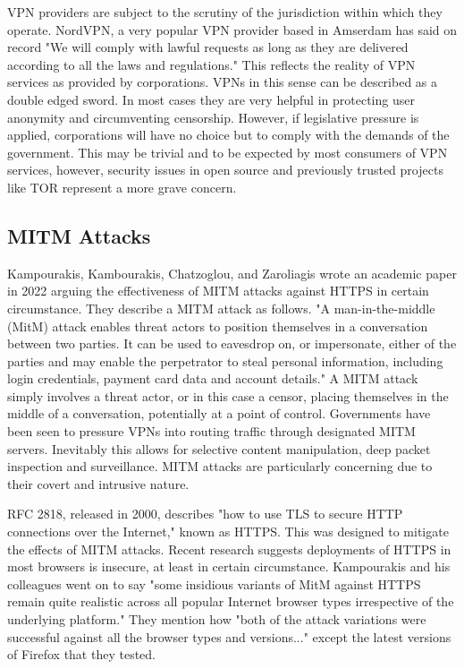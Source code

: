 VPN providers are subject to the scrutiny of the jurisdiction within which they operate. NordVPN, a very popular VPN provider based in Amserdam has said on record "We will comply with lawful requests as long as they are delivered according to all the laws and regulations." \cite{nordvpnPrivacy2024} This reflects the reality of VPN services as provided by corporations. VPNs in this sense can be described as a double edged sword. In most cases they are very helpful in protecting user anonymity and circumventing censorship. However, if legislative pressure is applied, corporations will have no choice but to comply with the demands of the government. This may be trivial and to be expected by most consumers of VPN services, however, security issues in open source and previously trusted projects like TOR represent a more grave concern. 

\subsection{MITM Attacks}
Kampourakis, Kambourakis, Chatzoglou, and Zaroliagis wrote an academic paper in 2022 arguing the effectiveness of MITM attacks against HTTPS in certain circumstance. They describe a MITM attack as follows. "A man-in-the-middle (MitM) attack enables threat actors to position themselves in a conversation between two parties. It can be used to eavesdrop on, or impersonate, either of the parties and may enable the perpetrator to steal personal information, including login credentials, payment card data and account details."\cite{MITMvHTTPS} A MITM attack simply involves a threat actor, or in this case a censor, placing themselves in the middle of a conversation, potentially at a point of control. Governments have been seen to pressure VPNs into routing traffic through designated MITM servers. Inevitably this allows for selective content manipulation, deep packet inspection and surveillance. MITM attacks are particularly concerning due to their covert and intrusive nature. 

RFC 2818, released in 2000, describes "how to use TLS to secure HTTP connections over the Internet," \cite{rfc2818}known as HTTPS. This was designed to mitigate the effects of MITM attacks. Recent research suggests deployments of HTTPS in most browsers is insecure, at least in certain circumstance. Kampourakis and his colleagues went on to say "some insidious variants of MitM against HTTPS remain quite realistic across all popular Internet browser types irrespective of the underlying platform." \cite{MITMvHTTPS} 
They mention how "both of the attack variations were successful against all the browser types and versions..." except the latest versions of Firefox that they tested.

